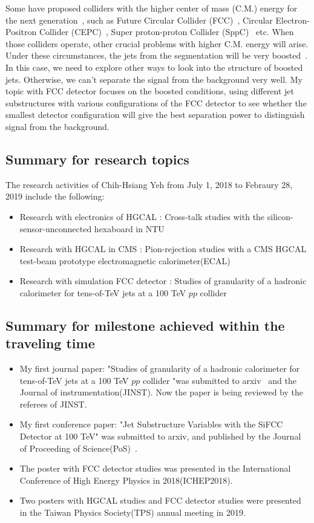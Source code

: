\documentclass[12pt,twoside,a4paper,an,final]{cms-tdr}
\begin{document}
Some have proposed colliders with the higher center of mass (C.M.) energy for the next generation~\cite{Shiltsev:2015tta}, such as Future Circular Collider (FCC)~\cite{Ellis:2018zpk}, Circular Electron-Positron Collider (CEPC)~\cite{CEPCStudyGroup:2018rmc}, Super proton-proton Collider (SppC)~\cite{Tang:2015qga} etc. When those colliders operate, other crucial problems with higher C.M. energy will arise. Under these circumstances, the jets from the segmentation will be very boosted~\cite{Coleman:2017fiq}. In this case, we need to explore other ways to look into the structure of boosted jets. Otherwise, we can't separate the signal from the background very well. My topic with FCC detector focuses on the boosted conditions, using different jet substructures with various configurations of the FCC detector to see whether the smallest detector configuration will give the best separation power to distinguish signal from the background.
\subsection{Summary for research topics}
The research activities of Chih-Hsiang Yeh from July 1, 2018 to Febraury 28, 2019 include the following:
\begin{itemize}
 \item Research with electronics of HGCAL : Cross-talk studies with the silicon-sensor-unconnected hexaboard in NTU
 \item Research with HGCAL in CMS : Pion-rejection studies with a CMS HGCAL test-beam prototype electromagnetic calorimeter(ECAL)
 \item Research with simulation FCC detector : Studies of granularity of a hadronic calorimeter for tens-of-TeV jets at a 100 TeV $pp$ collider
\end{itemize}

\subsection{Summary for milestone achieved within the traveling time}
\begin{itemize}
\item My first journal paper: "Studies of granularity of a hadronic calorimeter for tens-of-TeV jets at a 100 TeV $pp$ collider "was submitted to arxiv~\cite{Yeh:2019xbj} and the Journal of instrumentation(JINST). Now the paper is being reviewed by the referees of JINST.
\item My first conference paper: "Jet Substructure Variables with the SiFCC Detector at 100 TeV" was submitted to arxiv, and published by the Journal of Proceeding of Science(PoS)~\cite{Yeh:2018ujb}.
\item The poster with FCC detector studies was presented in the International Conference of High Energy Physics in 2018(ICHEP2018).
\item Two posters with HGCAL studies and FCC detector studies were presented in the Taiwan Physics Society(TPS) annual meeting in 2019. 
\end{itemize}
\end{document}
